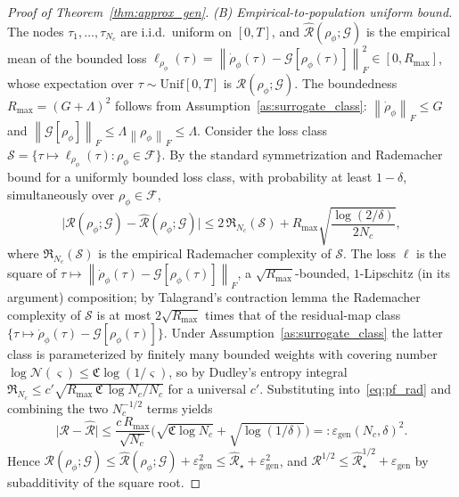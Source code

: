 \documentclass[twocolumn,aps,prxquantum,superscriptaddress,nofootinbib,floatfix,longbibliography]{revtex4-2}
\newcommand{\calG}{\mathcal{G}}
\newcommand{\norm}[1]{\left\lVert #1 \right\rVert}
\newcommand{\rhophi}{\rho_{\phi}}
\begin{document}
\begin{proof}[Proof of Theorem~\ref{thm:approx_gen}]
\emph{(B) Empirical-to-population uniform bound.} The nodes $\tau_1,\dots,\tau_{N_c}$ are i.i.d.\ uniform on $[0,T]$, and $\widehat{\mathcal{R}}(\rhophi;\calG)$ is the empirical mean of the bounded loss $\ell_{\rhophi}(\tau)=\norm{\dot\rhophi(\tau)-\calG[\rhophi(\tau)]}_F^2\in[0,R_{\max}]$, whose expectation over $\tau\sim\mathrm{Unif}[0,T]$ is $\mathcal{R}(\rhophi;\calG)$. The boundedness $R_{\max}=(G+\Lambda)^2$ follows from Assumption~\ref{as:surrogate_class}: $\norm{\dot\rhophi}_F\le G$ and $\norm{\calG[\rhophi]}_F\le\Lambda\norm{\rhophi}_F\le\Lambda$. Consider the loss class $\mathcal{S}=\{\tau\mapsto\ell_{\rhophi}(\tau):\rhophi\in\mathcal{F}\}$. By the standard symmetrization and Rademacher bound for a uniformly bounded loss class, with probability at least $1-\delta$, simultaneously over $\rhophi\in\mathcal{F}$,
\begin{equation}
\big\lvert\mathcal{R}(\rhophi;\calG)-\widehat{\mathcal{R}}(\rhophi;\calG)\big\rvert\le2\,\mathfrak{R}_{N_c}(\mathcal{S})+R_{\max}\sqrt{\frac{\log(2/\delta)}{2N_c}},
\label{eq:pf_rad}
\end{equation}
where $\mathfrak{R}_{N_c}(\mathcal{S})$ is the empirical Rademacher complexity of $\mathcal{S}$. The loss $\ell$ is the square of $\tau\mapsto\norm{\dot\rhophi(\tau)-\calG[\rhophi(\tau)]}_F$, a $\sqrt{R_{\max}}$-bounded, $1$-Lipschitz (in its argument) composition; by Talagrand's contraction lemma the Rademacher complexity of $\mathcal{S}$ is at most $2\sqrt{R_{\max}}$ times that of the residual-map class $\{\tau\mapsto\dot\rhophi(\tau)-\calG[\rhophi(\tau)]\}$. Under Assumption~\ref{as:surrogate_class} the latter class is parameterized by finitely many bounded weights with covering number $\log\mathcal{N}(\varsigma)\le\mathfrak{C}\log(1/\varsigma)$, so by Dudley's entropy integral $\mathfrak{R}_{N_c}\le c'\sqrt{R_{\max}\,\mathfrak{C}\,\log N_c/N_c}$ for a universal $c'$. Substituting into~\eqref{eq:pf_rad} and combining the two $N_c^{-1/2}$ terms yields
\[
\big\lvert\mathcal{R}-\widehat{\mathcal{R}}\big\rvert\le\frac{c\,R_{\max}}{\sqrt{N_c}}\Big(\sqrt{\mathfrak{C}\log N_c}+\sqrt{\log(1/\delta)}\Big)=:\varepsilon_{\mathrm{gen}}(N_c,\delta)^2 .
\]
Hence $\mathcal{R}(\rhophi;\calG)\le\widehat{\mathcal{R}}(\rhophi;\calG)+\varepsilon_{\mathrm{gen}}^2\le\widehat{\mathcal{R}}_\star+\varepsilon_{\mathrm{gen}}^2$, and $\mathcal{R}^{1/2}\le\widehat{\mathcal{R}}_\star^{1/2}+\varepsilon_{\mathrm{gen}}$ by subadditivity of the square root.


\end{proof}
\end{document}
